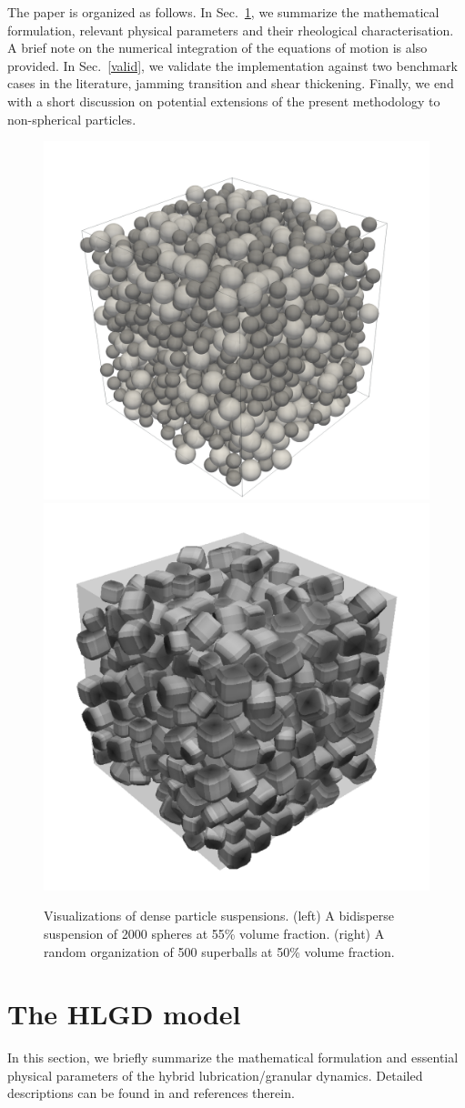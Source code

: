 The paper is organized as follows. In Sec.\ \ref{sec:dlcd}, we summarize the mathematical formulation, relevant physical parameters and their rheological characterisation. A brief note on the numerical integration of the equations of motion is also provided. In Sec.\ \ref{valid}, we validate the implementation against two benchmark cases in the literature, \ie jamming transition and shear thickening. Finally, we end with a short discussion on potential extensions of the present methodology to non-spherical particles.


\begin{figure}%
  \centering
  \includegraphics[width=0.44\columnwidth]{figs/np2000_vol0.55.png}
  \includegraphics[width=0.4\columnwidth]{figs/spb_np500_vol0.5.pdf}
  \caption{Visualizations of dense particle suspensions. (left) A bidisperse suspension of 2000 spheres at 55\% volume fraction. (right) A random organization of 500 superballs at 50\% volume fraction.}
  \label{fig:snap}
\end{figure}


\section{The HLGD model}
\label{sec:dlcd}

In this section, we briefly summarize the mathematical formulation and essential physical parameters of the hybrid lubrication/granular dynamics. Detailed descriptions can be found in \cite{Seto_PRL2013, Mari_Seto_2014JoR, Cheal_Ness_2018} and references therein.

